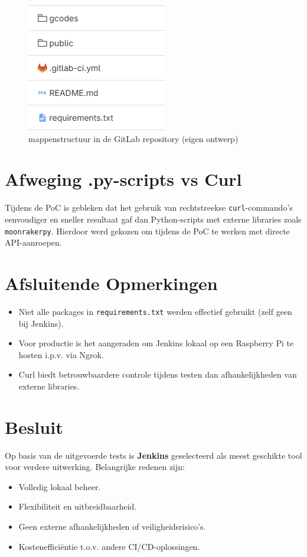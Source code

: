 \begin{enumerate}
\begin{figure}[H]
    \centering
    \includegraphics[width=0.3\linewidth]{foto's/Gitlab/folder.png}
    \caption{mappenstructuur in de GitLab repository (eigen ontwerp)}
    \label{fig:GitLab_Repo}
\end{figure}

\section{Afweging .py-scripts vs Curl}
Tijdens de PoC is gebleken dat het gebruik van rechtstreekse \texttt{curl}-commando’s eenvoudiger en sneller resultaat gaf dan Python-scripts met externe libraries zoals \texttt{moonrakerpy}. Hierdoor werd gekozen om tijdens de PoC te werken met directe API-aanroepen.

\section{Afsluitende Opmerkingen}
\begin{itemize}
    \item Niet alle packages in \texttt{requirements.txt} werden effectief gebruikt (zelf geen bij Jenkins).
    \item Voor productie is het aangeraden om Jenkins lokaal op een Raspberry Pi te hosten i.p.v. via Ngrok.
    \item Curl biedt betrouwbaardere controle tijdens testen dan afhankelijkheden van externe libraries.
\end{itemize}

\section{Besluit}

Op basis van de uitgevoerde tests is \textbf{Jenkins} geselecteerd als meest geschikte tool voor verdere uitwerking. Belangrijke redenen zijn:

\begin{itemize}
    \item Volledig lokaal beheer.
    \item Flexibiliteit en uitbreidbaarheid.
    \item Geen externe afhankelijkheden of veiligheidsrisico’s.
    \item Kostenefficiëntie t.o.v. andere CI/CD-oplossingen.
\end{itemize}


\end{enumerate}
